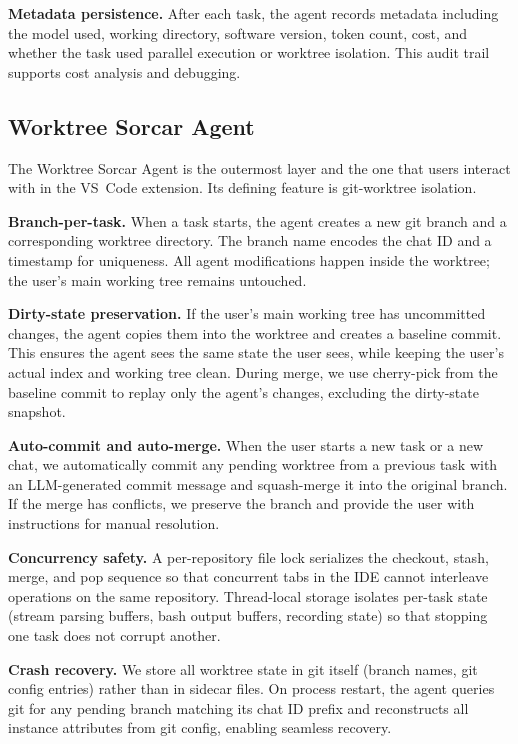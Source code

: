\documentclass{article}
\begin{document}
\textbf{Metadata persistence.}  After each task, the agent records
metadata including the model used, working directory, software version,
token count, cost, and whether the task used parallel execution or
worktree isolation.  This audit trail supports cost analysis and
debugging.

\subsection{Worktree Sorcar Agent}
\label{sec:worktree-agent}

The Worktree Sorcar Agent is the outermost layer and the one that
users interact with in the VS~Code extension.  Its defining feature is
git-worktree isolation.

\textbf{Branch-per-task.}  When a task starts, the agent creates a new
git branch and a corresponding worktree directory.  The branch name
encodes the chat ID and a timestamp for uniqueness.  All agent
modifications happen inside the worktree; the user's main working tree
remains untouched.

\textbf{Dirty-state preservation.}  If the user's main working tree
has uncommitted changes, the agent copies them into the worktree and
creates a baseline commit.  This ensures the agent sees the same state
the user sees, while keeping the user's actual index and working tree
clean.  During merge, we use cherry-pick from the baseline
commit to replay only the agent's changes, excluding the
dirty-state snapshot.

\textbf{Auto-commit and auto-merge.}  When the user starts a new task
or a new chat, we automatically commit any pending worktree from a
previous task with an LLM-generated commit message and squash-merge it
into the original branch.  If the merge has conflicts, we preserve the
branch and provide the user with instructions for manual resolution.

\textbf{Concurrency safety.}  A per-repository file lock serializes
the checkout, stash, merge, and pop sequence so that concurrent tabs
in the IDE cannot interleave operations on the same repository.
Thread-local storage isolates per-task state (stream parsing buffers,
bash output buffers, recording state) so that stopping one task does
not corrupt another.

\textbf{Crash recovery.}  We store all worktree state in git itself
(branch names, git config entries) rather than in sidecar files.  On
process restart, the agent queries git for any pending
branch matching its chat ID prefix and reconstructs all instance
attributes from git config, enabling seamless recovery.
\end{document}
